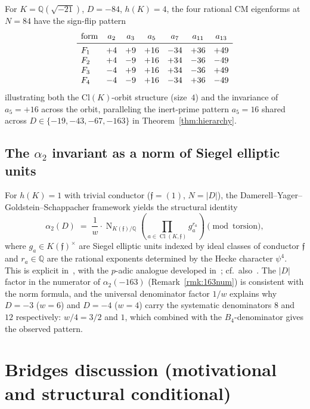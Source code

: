 \documentclass[12pt]{amsart}
\theoremstyle{definition}
\DeclareMathOperator{\Nm}{N}
\DeclareMathOperator{\Cl}{Cl}
\newcommand{\Q}{\mathbb{Q}}
\newcommand{\ff}{\mathfrak{f}}
\begin{document}
For $K = \Q(\sqrt{-21})$, $D = -84$, $h(K) = 4$, the four rational
CM eigenforms at $N = 84$ have the sign-flip pattern
\[
  \begin{array}{lcccccc}
    \text{form} & a_2 & a_3 & a_5 & a_7 & a_{11} & a_{13} \\\midrule
    F_1 & +4 & +9 & +16 & -34 & +36 & +49 \\
    F_2 & +4 & -9 & +16 & +34 & -36 & -49 \\
    F_3 & -4 & +9 & +16 & +34 & -36 & +49 \\
    F_4 & -4 & -9 & +16 & -34 & +36 & -49
  \end{array}
\]
illustrating both the Cl$(K)$-orbit structure (size~$4$) and the
invariance of $a_5 = +16$ across the orbit, paralleling the inert-prime
pattern $a_5 = 16$ shared across $D \in \{-19,-43,-67,-163\}$ in
Theorem~\ref{thm:hierarchy}.

\subsection{The $\alpha_2$ invariant as a norm of Siegel elliptic units}

For $h(K) = 1$ with trivial conductor ($\ff = (1)$, $N = |D|$), the
Damerell--Yager--Goldstein--Schappacher framework yields the
structural identity
\begin{equation}\label{eq:siegel}
  \alpha_2(D) \;=\; \frac{1}{w} \cdot
    \Nm_{K(\ff)/\Q}\!\left( \prod_{a \in \Cl(K, \ff)} g_a^{r_a} \right)
    \pmod{\text{torsion}},
\end{equation}
where $g_a \in K(\ff)^\times$ are Siegel elliptic units indexed by
ideal classes of conductor $\ff$ and $r_a \in \Q$ are the rational
exponents determined by the Hecke character $\psi^4$. This is
explicit in~\cite{GoldsteinSchappacher1981}, with the $p$-adic
analogue developed in~\cite{Kriz2018}; cf.\
also~\cite{CITE-NEEDED-Katz1978}. The $|D|$ factor in the numerator
of $\alpha_2(-163)$ (Remark~\ref{rmk:163num}) is consistent with the
norm formula, and the universal denominator factor $1/w$ explains
why $D = -3$ ($w = 6$) and $D = -4$ ($w = 4$) carry the systematic
denominators $8$ and $12$ respectively: $w/4 = 3/2$ and $1$, which
combined with the $B_4$-denominator gives the observed pattern.

\section{Bridges discussion (motivational and structural conditional)}
\label{sec:bridges}
\end{document}
